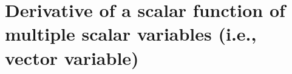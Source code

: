 \documentclass[12pt,letter]{article}
\begin{document}
%
%
%
%
%
%
%
%
%
\section{Derivative of a scalar function of multiple scalar variables (i.e., vector variable)}
\end{document}
